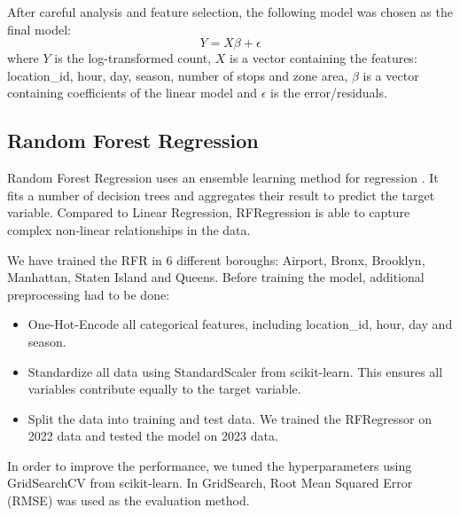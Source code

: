\documentclass[11pt]{article}
\begin{document}
After careful analysis and feature selection, the following model was chosen as the final model: \[Y=X\beta + \epsilon\] where $Y$ is the log-transformed count, $X$ is a vector containing the features: location\_id, hour, day, season, number of stops and zone area, $\beta$ is a vector containing coefficients of the linear model and $\epsilon$ is the error/residuals. 

\subsection{Random Forest Regression}

Random Forest Regression uses an ensemble learning method for regression \cite{comp30027}. It fits a number of decision trees and aggregates their result to predict the target variable. Compared to Linear Regression, RFRegression is able to capture complex non-linear relationships in the data.

We have trained the RFR in 6 different boroughs: Airport, Bronx, Brooklyn, Manhattan, Staten Island and Queens. Before training the model, additional preprocessing had to be done:
\begin{itemize}
    \item One-Hot-Encode all categorical features, including location\_id, hour, day and season.
    \item Standardize all data using StandardScaler from scikit-learn. This ensures all variables contribute equally to the target variable.
    \item Split the data into training and test data. We trained the RFRegressor on 2022 data and tested the model on 2023 data.
\end{itemize}

In order to improve the performance, we tuned the hyperparameters using GridSearchCV from scikit-learn. In GridSearch, Root Mean Squared Error (RMSE) was used as the evaluation method. 
\end{document}
